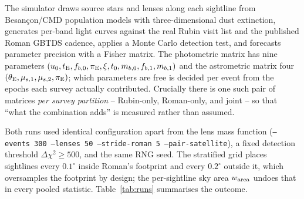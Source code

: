 \documentclass[english,10pt,a4paper]{article}
\newcommand{\tE}{t_{\rm E}}
\newcommand{\piE}{\pi_{\rm E}}
\newcommand{\tetE}{\theta_{\rm E}}
\begin{document}
The simulator draws source stars and lenses along each sightline from Besan\c{c}on/CMD
population models with three-dimensional dust extinction, generates per-band light curves
against the real Rubin visit list and the published Roman GBTDS cadence, applies a Monte Carlo
detection test, and forecasts parameter precision with a Fisher matrix. The photometric matrix
has nine parameters $(u_0,\tE,f_{b,0},\piE,\xi,t_0,m_{b,0},f_{b,1},m_{b,1})$ and the astrometric
matrix four $(\tetE,\mu_{s,1},\mu_{s,2},\piE)$; which parameters are free is decided per event
from the epochs each survey actually contributed. Crucially there is one such pair of matrices
\emph{per survey partition} -- Rubin-only, Roman-only, and joint -- so that ``what the
combination adds'' is measured rather than assumed.

Both runs used identical configuration apart from the lens mass function
(\texttt{--events 300 --lenses 50 --stride-roman 5 --pair-satellite}), a fixed detection
threshold $\Delta\chi^2 \ge 500$, and the same RNG seed. The stratified grid places sightlines
every $0.1^\circ$ inside Roman's footprint and every $0.2^\circ$ outside it, which oversamples
the footprint by design; the per-sightline sky area $w_{\rm area}$ undoes that in every pooled
statistic. Table~\ref{tab:runs} summarises the outcome.
\end{document}
